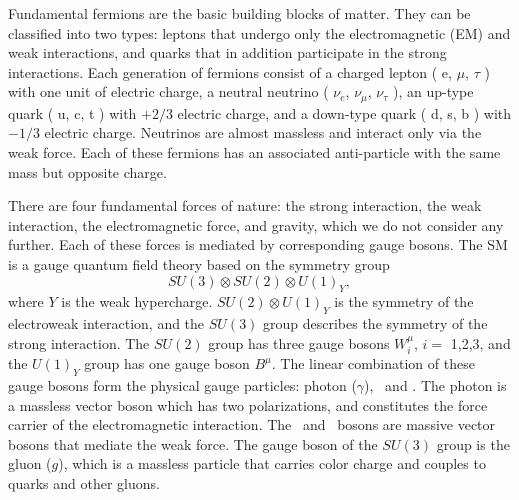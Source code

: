 \documentclass[thesis.tex]{subfiles}
\begin{document}
Fundamental fermions are the basic building blocks of matter. 
They can be classified into two types: leptons that undergo only the electromagnetic (EM) and weak interactions, and quarks that in addition participate in the strong interactions. 
Each generation of fermions consist of a charged lepton ( e, $\mu$, $\tau$ ) with one unit of electric charge, a neutral neutrino ( $\nu_e$, $\nu_\mu$, $\nu_\tau$ ),  an up-type quark ( u, c, t ) with $+2/3$ electric charge, and a down-type quark ( d, s, b ) with $-1/3$ electric charge. 
Neutrinos are almost massless and interact only via the weak force.
Each of these fermions has an associated anti-particle with the same mass but opposite charge. 

There are four fundamental forces of nature: the strong interaction, the weak interaction, the electromagnetic force, and gravity, which we do not consider any further. 
Each of these forces is mediated by corresponding gauge bosons. 
The SM is a gauge quantum field theory based on the symmetry group 
	\begin{equation}
		SU(3) \otimes SU(2) \otimes U(1)_Y,
	\end{equation}
where $Y$ is the weak hypercharge. 
$SU(2)\otimes U(1)_Y$ is the symmetry of the electroweak interaction, and the $SU(3)$ group describes the symmetry of the strong interaction. 
The $SU(2)$ group has three gauge bosons $W^{\mu}_i$, $i =$ 1,2,3, and the $U(1)_Y$ group has one gauge boson $B^{\mu}$. 
The linear combination of these gauge bosons form the physical gauge particles: photon ($\gamma$), \PWpm~and \PZ. 
The photon is a massless vector boson which has two polarizations, and constitutes the force carrier of the electromagnetic interaction. 
The \PWpm~and \PZ ~bosons are massive vector bosons that mediate the weak force. 
The gauge boson of the $SU(3)$ group is the gluon ($g$), which is a massless particle that carries color charge and couples to quarks and other gluons. 
\end{document}
